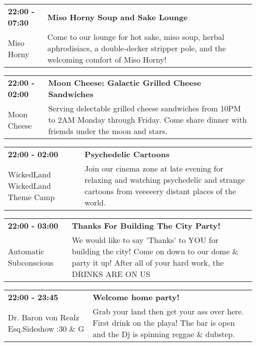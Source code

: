 \begin{tabular}{ p{1in} p{2.2in} }
    \textbf{22:00 - 07:30} & \textbf{Miso Horny Soup and Sake Lounge} \\
    Miso Horny \newline  & Come to our lounge for hot sake, miso soup, herbal aphrodisiacs, a double-decker stripper pole, and the welcoming comfort of Miso Horny! \\
    \hline 
\end{tabular}
    
\begin{tabular}{ p{1in} p{2.2in} }
    \textbf{22:00 - 02:00} & \textbf{Moon Cheese: Galactic Grilled Cheese Sandwiches} \\
    Moon Cheese \newline  & Serving delectable grilled cheese sandwiches from 10PM to 2AM Monday through Friday. Come share dinner with friemds under the moon and stars. \\
    \hline 
\end{tabular}
    
\begin{tabular}{ p{1in} p{2.2in} }
    \textbf{22:00 - 02:00} & \textbf{Psychedelic Cartoons} \\
    WickedLand \newline WickedLand Theme Camp & Join our cinema zone at late evening for relaxing and watching psychedelic and strange cartoons from veeeeery distant places of the world. \\
    \hline 
\end{tabular}
    
\begin{tabular}{ p{1in} p{2.2in} }
    \textbf{22:00 - 03:00} & \textbf{Thanks For Building The City Party!} \\
    Automatic Subconscious \newline  & We would like to say 'Thanks' to YOU for building the city! Come on down to our dome \& party it up! After all of your hard work, the DRINKS ARE ON US \\
    \hline 
\end{tabular}
    
\begin{tabular}{ p{1in} p{2.2in} }
    \textbf{22:00 - 23:45} & \textbf{Welcome home party! } \\
    Dr. Baron von Realz Esq.Sideshow \newline 4:30 \& G & Grab your land then get your ass over here. First drink on the playa!  The bar is open and the Dj is spinning reggae \& dubstep. \\
    \hline 
\end{tabular}
    
